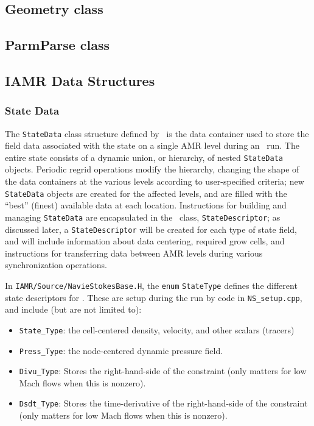 \subsection{Geometry class}

\subsection{ParmParse class}

\subsection{IAMR Data Structures}

\subsubsection{State Data}

The {\tt StateData} class structure defined by \amrex\ is the data container
used to store the field data associated with the state on a single AMR level
during an \iamr\ run.  The entire state consists of a dynamic union, or hierarchy, of
nested {\tt StateData} objects.  Periodic regrid operations modify the hierarchy,
changing the shape of the data containers at the various levels according to
user-specified criteria; new {\tt StateData} objects are created
for the affected levels, and are filled with the ``best'' (finest) available 
data at each location. Instructions for building and managing {\tt StateData} are
encapsulated in the \amrex\ class, {\tt StateDescriptor}; as discussed later,
a {\tt StateDescriptor} will be created for each type of state field, and 
will include information about data centering, required grow cells, and
instructions for transferring data between AMR levels during various synchronization
operations.

In {\tt IAMR/Source/NavieStokesBase.H}, the {\tt enum} {\tt StateType} defines the
different state descriptors for \iamr.  These are setup during the
run by code in {\tt NS\_setup.cpp}, and include (but are not limited to):
\begin{itemize}
\item {\tt State\_Type}: the cell-centered density, velocity, and other scalars (tracers)
\item {\tt Press\_Type}: the node-centered dynamic pressure field.
\item {\tt Divu\_Type}: Stores the right-hand-side of the constraint 
(only matters for low Mach flows when this is nonzero).
\item {\tt Dsdt\_Type}: Stores the time-derivative of the right-hand-side of the constraint 
(only matters for low Mach flows when this is nonzero).
\end{itemize}

